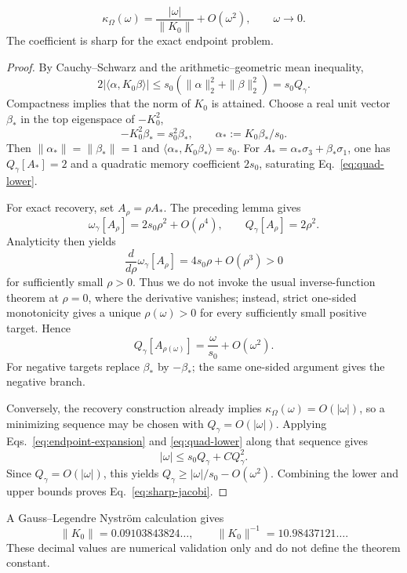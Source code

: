 \begin{theorem}
\label{thm:jacobi-sharp}
\begin{equation}
\boxed{\kappa_\Omega(\omega)=\frac{|\omega|}{\|K_0\|}+O(\omega^2),\qquad \omega\to0.}
\label{eq:sharp-jacobi}
\end{equation}
The coefficient is sharp for the exact endpoint problem.
\end{theorem}
\begin{proof}
By Cauchy--Schwarz and the arithmetic--geometric mean inequality,
\begin{equation}
2|\langle\alpha,K_0\beta\rangle|
\le s_0(\|\alpha\|_2^2+\|\beta\|_2^2)=s_0Q_\gamma.
\label{eq:quad-lower}
\end{equation}
Compactness implies that the norm of $K_0$ is attained. Choose a real unit vector $\beta_*$ in the top eigenspace of $-K_0^2$,
\[
-K_0^2\beta_*=s_0^2\beta_*,\qquad
\alpha_*:=K_0\beta_*/s_0.
\]
Then $\|\alpha_*\|=\|\beta_*\|=1$ and $\langle\alpha_*,K_0\beta_*\rangle=s_0$. For $A_*=\alpha_*\sigma_3+\beta_*\sigma_1$, one has $Q_\gamma[A_*]=2$ and a quadratic memory coefficient $2s_0$, saturating Eq.~\eqref{eq:quad-lower}.

For exact recovery, set $A_\rho=\rho A_*$. The preceding lemma gives
\begin{equation}
\omega_\gamma[A_\rho]=2s_0\rho^2+O(\rho^4),\qquad Q_\gamma[A_\rho]=2\rho^2.
\label{eq:recovery-ray}
\end{equation}
Analyticity then yields
\[
\frac{d}{d\rho}\omega_\gamma[A_\rho]=4s_0\rho+O(\rho^3)>0
\]
for sufficiently small $\rho>0$. Thus we do not invoke the usual inverse-function theorem at $\rho=0$, where the derivative vanishes; instead, strict one-sided monotonicity gives a unique $\rho(\omega)>0$ for every sufficiently small positive target. Hence
\[
Q_\gamma[A_{\rho(\omega)}]=\frac{\omega}{s_0}+O(\omega^2).
\]
For negative targets replace $\beta_*$ by $-\beta_*$; the same one-sided argument gives the negative branch.

Conversely, the recovery construction already implies $\kappa_\Omega(\omega)=O(|\omega|)$, so a minimizing sequence may be chosen with $Q_\gamma=O(|\omega|)$. Applying Eqs.~\eqref{eq:endpoint-expansion} and \eqref{eq:quad-lower} along that sequence gives
\[
|\omega|\le s_0Q_\gamma+C Q_\gamma^2.
\]
Since $Q_\gamma=O(|\omega|)$, this yields $Q_\gamma\ge |\omega|/s_0-O(\omega^2)$. Combining the lower and upper bounds proves Eq.~\eqref{eq:sharp-jacobi}.
\end{proof}

A Gauss--Legendre Nystr\"om calculation gives
\begin{equation}
\|K_0\|=0.09103843824\ldots,\qquad \|K_0\|^{-1}=10.98437121\ldots.
\label{eq:numeric-k0}
\end{equation}
These decimal values are numerical validation only and do not define the theorem constant.